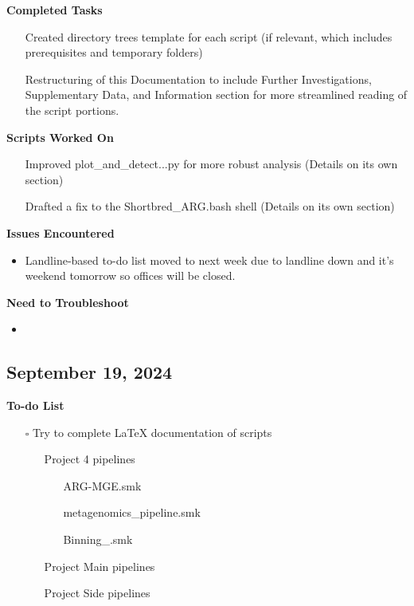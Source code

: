\documentclass[11pt]{report}
\newcommand{\done}{\checkmark}
\newcommand{\pending}{$\square$}
\newcommand{\moved}{\faArrowCircleRight}
\begin{document}
{\begin{multicols}{2}
\textbf{Completed Tasks} 
\begin{itemize}
	\item [\done] Created directory trees template for each script (if relevant, which includes prerequisites and temporary folders)
	\item [\done] Restructuring of this Documentation to include Further Investigations, Supplementary Data, and Information section for more streamlined reading of the script portions. 
\end{itemize}

\textbf{Scripts Worked On}
\begin{itemize}
	\item [\done] Improved plot\_and\_detect...py for more robust analysis (Details on its own section)
	\item [\done] Drafted a fix to the Shortbred\_ARG.bash shell (Details on its own section)
\end{itemize}


\textbf{Issues Encountered}
\begin{itemize}
	\item Landline-based to-do list moved to next week due to landline down and it's weekend tomorrow so offices will be closed. 
\end{itemize}

\textbf{Need to Troubleshoot}
\begin{itemize}
	\item 
\end{itemize}
\end{multicols}

\newpage

\begin{multicols}{2}
\section{September 19, 2024}


\textbf{To-do List}
\begin{itemize}
	\item [\pending] Try to complete LaTeX documentation of scripts
	
	\begin{itemize}
		\item [\done] Project 4 pipelines
			\begin{itemize}
				\item [\done] ARG-MGE.smk
				\item [\done] metagenomics\_pipeline.smk
				\item [\done] Binning\_.smk
			\end{itemize}
		\item [\moved] Project Main pipelines
		\item [\moved] Project Side pipelines
		

\end{itemize}
\end{itemize}
\end{multicols}}
\end{document}
